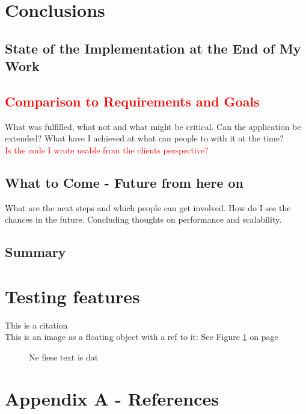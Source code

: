 \documentclass[11p]{scrartcl}
\begin{document}
\section{Conclusions}
\label{sec:conclusions}
\subsection{State of the Implementation at the End of My Work}
\subsection{\textcolor{red}{Comparison to Requirements and Goals}}
What was fulfilled, what not and what might be critical. Can the application be extended? What have I achieved at what can people to with it at the time?\\
\textcolor{red}{Is the code I wrote usable from the clients perspective?}
\subsection{What to Come - Future from here on}
What are the next steps and which people can get involved. How do I see the chances in the future. Concluding thoughts on performance and scalability.
\subsection{Summary}


\section*{Testing features}
This is a citation \cite{Chang2008}\\
This is an image as a floating object with a ref to it: See Figure \ref{fig:fieseText} on page \pageref{fig:fieseText}
\begin{figure}[h]		
	\caption{Ne fiese text is dat}
	\label{fig:fieseText}
\end{figure}

\section*{Appendix A - References}


\end{document}
